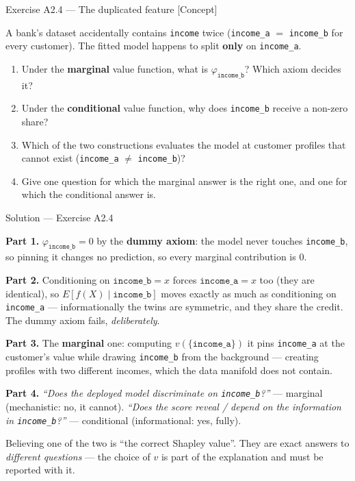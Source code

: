 \documentclass[aspectratio=169,11pt]{beamer}
\begin{document}
\begin{frame}{Exercise A2.4 --- The duplicated feature [Concept]}
\begin{exercise}
  A bank's dataset accidentally contains \texttt{income} twice
  (\texttt{income\_a} $=$ \texttt{income\_b} for every customer). The fitted
  model happens to split \textbf{only} on \texttt{income\_a}.
  \begin{enumerate}
    \item Under the \textbf{marginal} value function, what is
          $\varphi_{\texttt{income\_b}}$? Which axiom decides it?
    \item Under the \textbf{conditional} value function, why does
          \texttt{income\_b} receive a non-zero share?
    \item Which of the two constructions evaluates the model at customer
          profiles that cannot exist (\texttt{income\_a} $\neq$
          \texttt{income\_b})?
    \item Give one question for which the marginal answer is the right one, and
          one for which the conditional answer is.
  \end{enumerate}
\end{exercise}
\end{frame}

\begin{frame}{Solution --- Exercise A2.4}
\begin{solutionbox}
  \textbf{Part 1.} $\varphi_{\texttt{income\_b}} = 0$ by the \textbf{dummy axiom}:
  the model never touches \texttt{income\_b}, so pinning it changes no prediction,
  so every marginal contribution is $0$.

  \smallskip
  \textbf{Part 2.} Conditioning on $\texttt{income\_b}=x$ forces
  $\texttt{income\_a}=x$ too (they are identical), so
  $E[f(X)\mid \texttt{income\_b}]$ moves exactly as much as conditioning on
  \texttt{income\_a} --- informationally the twins are symmetric, and they share
  the credit. The dummy axiom fails, \emph{deliberately}.

  \smallskip
  \textbf{Part 3.} The \textbf{marginal} one: computing
  $v(\{\texttt{income\_a}\})$ it pins \texttt{income\_a} at the customer's value
  while drawing \texttt{income\_b} from the background --- creating profiles with
  two different incomes, which the data manifold does not contain.

  \smallskip
  \textbf{Part 4.} \emph{``Does the deployed model discriminate on
  \texttt{income\_b}?''} --- marginal (mechanistic: no, it cannot).
  \emph{``Does the score reveal / depend on the information in
  \texttt{income\_b}?''} --- conditional (informational: yes, fully).
\end{solutionbox}
\begin{mistake}
  Believing one of the two is ``the correct Shapley value''. They are exact answers
  to \emph{different questions} --- the choice of $v$ is part of the explanation and
  must be reported with it.
\end{mistake}
\end{frame}
\end{document}
